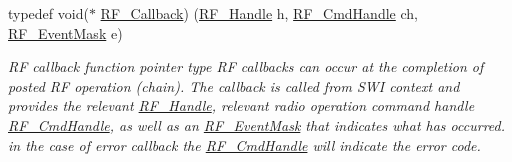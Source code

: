 \begin{DoxyCompactItemize}
typedef void($\ast$ \hyperlink{_r_f_8h_a4d2ce6dc70b0f329dc5e249ec10c574a}{R\+F\+\_\+\+Callback}) (\hyperlink{_r_f_8h_a5e8ab7fc87fb818f435d9b6226ee573f}{R\+F\+\_\+\+Handle} h, \hyperlink{_r_f_8h_acab1f56c62a9fd1ad0a91a46b6da23f1}{R\+F\+\_\+\+Cmd\+Handle} ch, \hyperlink{_r_f_8h_a128c46e18dbbaa781abb7abafc35233a}{R\+F\+\_\+\+Event\+Mask} e)
\begin{DoxyCompactList}\small\item\em R\+F callback function pointer type R\+F callbacks can occur at the completion of posted R\+F operation (chain). The callback is called from S\+W\+I context and provides the relevant \hyperlink{_r_f_8h_a5e8ab7fc87fb818f435d9b6226ee573f}{R\+F\+\_\+\+Handle}, relevant radio operation command handle \hyperlink{_r_f_8h_acab1f56c62a9fd1ad0a91a46b6da23f1}{R\+F\+\_\+\+Cmd\+Handle}, as well as an \hyperlink{_r_f_8h_a128c46e18dbbaa781abb7abafc35233a}{R\+F\+\_\+\+Event\+Mask} that indicates what has occurred. in the case of error callback the \hyperlink{_r_f_8h_acab1f56c62a9fd1ad0a91a46b6da23f1}{R\+F\+\_\+\+Cmd\+Handle} will indicate the error code. \end{DoxyCompactList}\end{DoxyCompactItemize}
